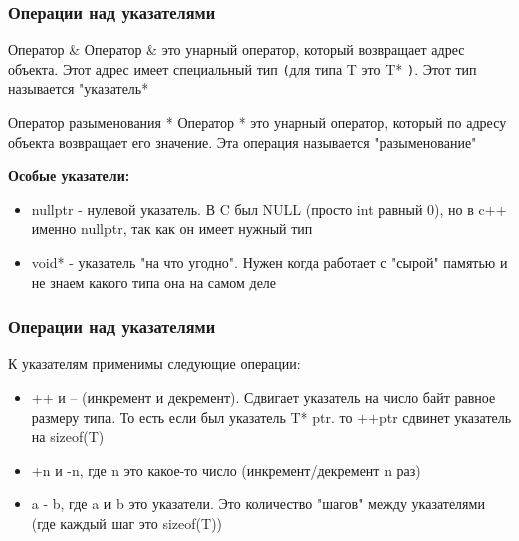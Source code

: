 \subsubsection{Операции над указателями}
\begin{definition}
{Оператор \&}{}
Оператор \& это унарный оператор, который возвращает адрес объекта. Этот адрес имеет специальный тип \texttt{(}для типа T это T* \texttt{)}. Этот тип называется "указатель*
\end{definition}
\begin{definition}
{Оператор разыменования *}{}
Оператор * это унарный оператор, который по адресу объекта возвращает его значение. Эта операция называется "разыменование"
\end{definition}
\textbf{Особые указатели:}
\begin{itemize}
  \item nullptr - нулевой указатель. В C был NULL (просто int равный 0), но в c++ именно nullptr, так как он имеет нужный тип
  \item void* - указатель "на что угодно". Нужен когда работает с "сырой" памятью и не знаем какого типа она на самом деле
\end{itemize}
\subsubsection{Операции над указателями}
К указателям применимы следующие операции:
\begin{itemize}
  \item  ++ и -- (инкремент и декремент). Сдвигает указатель на число байт равное размеру типа. То есть если был указатель T* ptr. то ++ptr сдвинет указатель на sizeof(T)
  \item +n и -n, где n это какое-то число (инкремент/декремент n раз)
  \item a - b, где a и b это указатели. Это количество "шагов" между указателями (где каждый шаг это sizeof(T))
\end{itemize}
\newpage

